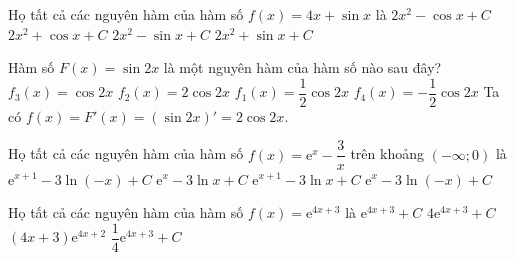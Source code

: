 %

\begin{ex}%
	Họ tất cả các nguyên hàm của hàm số $f(x)=4x+\sin x$ là
	\choice
	{\True $2x^2-\cos x+C$}
	{$2x^2+\cos x+C$}
	{$2x^2-\sin x+C$}
	{$2x^2+\sin x+C$}
\end{ex}

\begin{ex}%
	Hàm số $F(x)=\sin 2x$ là một nguyên hàm của hàm số nào sau đây?
	\choice
	{$f_3(x)=\cos 2x$}
	{\True $f_2(x)=2\cos 2x$}
	{$f_1(x)=\dfrac{1}{2}\cos 2x$}
	{$f_4(x)=-\dfrac{1}{2}\cos 2x$}
	\loigiai
	{
	Ta có $f(x)=F'(x) =(\sin 2x)'=2\cos 2x$.
	}
\end{ex}

%

\begin{ex}%
	Họ tất cả các nguyên hàm của hàm số $f(x) = \mathrm{e}^{x} - \dfrac{3}{x}$ trên khoảng $(-\infty;0)$ là
	\choice
	{$\mathrm{e}^{x+1} - 3\ln(-x) + C$}
	{\True $\mathrm{e}^{x} - 3\ln x + C$}
	{$\mathrm{e}^{x+1} - 3\ln x + C$}
	{$\mathrm{e}^{x} - 3\ln(-x) + C$}
\end{ex}

%

\begin{ex}%
	Họ tất cả các nguyên hàm của hàm số $f(x)=\mathrm{e}^{4x+3}$ là
	\choice
	{$\mathrm{e}^{4x+3}+C$}
	{$4\mathrm{e}^{4x+3}+C$}
	{$(4x+3) \mathrm{e}^{4x+2}$}
	{\True $\dfrac{1}{4} \mathrm{e}^{4x+3}+C$}
\end{ex}

